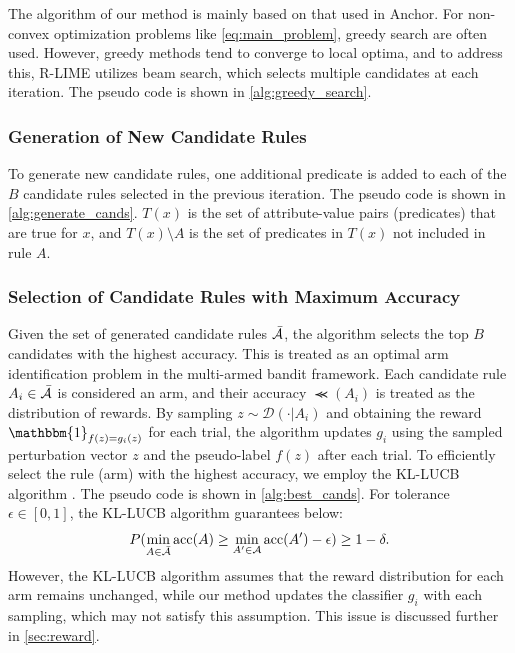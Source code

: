 \documentclass[runningheads]{llncs}
\begin{document}
The algorithm of our method
is mainly based on that used in Anchor\cite{ribeiro2018anchors}.
For non-convex optimization problems like \cref{eq:main_problem},
greedy search are often used.
However,
greedy methods tend to converge to local optima, and to address this,
R-LIME utilizes beam search,
which selects multiple candidates at each iteration.
The pseudo code is shown in \cref{alg:greedy_search}.

\subsubsection{Generation of New Candidate Rules}
To generate new candidate rules,
one additional predicate is added to each of the $B$ candidate rules
selected in the previous iteration.
The pseudo code is shown in \cref{alg:generate_cands}.
$T(x)$ is the set of attribute-value pairs (predicates) that are true for $x$,
and $T(x)\setminus A$ is the set of predicates in $T(x)$ not included in rule $A$.

\subsubsection{Selection of Candidate Rules with Maximum Accuracy}
Given the set of generated candidate rules $\bar{\mathcal{A}}$,
the algorithm selects the top $B$ candidates with the highest accuracy.
This is treated as an optimal arm identification problem in the multi-armed bandit framework.
Each candidate rule $A_i\in\bar{\mathcal{A}}$ is considered an arm,
and their accuracy $\Prec(A_i)$ is treated as the distribution of rewards.
By sampling $z\sim\mathcal{D}(\cdot|A_i)$
and obtaining the reward $\mathbbm{1}_{f(z)=g_i(z)}$ for each trial,
the algorithm updates $g_i$ using the sampled perturbation vector $z$
and the pseudo-label $f(z)$ after each trial.
To efficiently select the rule (arm) with the highest accuracy,
we employ the KL-LUCB algorithm \cite{kaufmann2013information}.
The pseudo code is shown in \cref{alg:best_cands}.
For tolerance $\epsilon\in[0,1]$, the KL-LUCB algorithm guarantees below:
\begin{equation}
	P(\underset{A\in\bar{\mathcal{A}}}{\min}\operatorname{acc}(A)\ge
	\underset{A'\in\mathcal{A}}{\min}\operatorname{acc}(A')-\epsilon)\ge1-\delta.
\end{equation}
However,
the KL-LUCB algorithm assumes that the reward distribution for each arm
remains unchanged,
while our method updates the classifier $g_i$ with each sampling,
which may not satisfy this assumption.
This issue is discussed further in \cref{sec:reward}.
\end{document}
